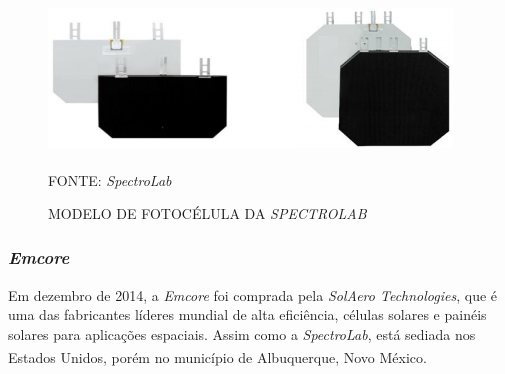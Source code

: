 \documentclass[
	12pt,				%
	openright,			%
	oneside,			%
	a4paper,			%
	english,			%
	french,				%
	spanish,			%
	brazil,				%
	oldfontcommands
	]{abntex2}
\begin{document}
	\begin{figure}[th]
		\caption{MODELO DE FOTOCÉLULA DA \textit{SPECTROLAB}}
		\label{Fig_Cell_Spectro}
		\centering
		\includegraphics[width=1.0\linewidth]{./figs/UTJ}
			
		\begin{small}
			FONTE: \textit{SpectroLab}\textsuperscript{\cite{SpectroLab2}}
		\end{small}		
	\end{figure}

\subsubsection[Emcore]{\textit{Emcore}}

	Em dezembro de 2014, a \textit{Emcore} foi comprada pela \textit{SolAero Technologies}, que é uma das fabricantes líderes mundial de alta eficiência, células solares e painéis solares para aplicações espaciais. Assim como a \textit{SpectroLab}, está sediada nos Estados Unidos, porém no município de Albuquerque, Novo México.\textsuperscript{\cite{Emcore}}\textsuperscript{\cite{Emcore2}}
	
\end{document}

